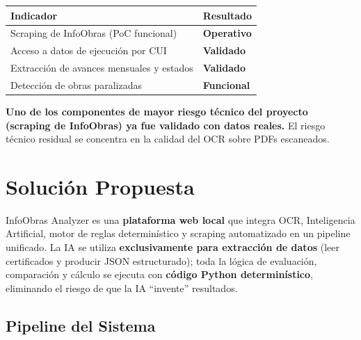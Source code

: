\documentclass[11pt,a4paper]{article}
\begin{document}
\begin{center}
\begin{tabular}{|>{\raggedright\arraybackslash}m{7cm}|>{\centering\arraybackslash}m{4cm}|}
\hline
\textbf{Indicador} & \textbf{Resultado} \\
\hline
Scraping de InfoObras (PoC funcional) & \textbf{Operativo} \\
\hline
Acceso a datos de ejecución por CUI & \textbf{Validado} \\
\hline
Extracción de avances mensuales y estados & \textbf{Validado} \\
\hline
Detección de obras paralizadas & \textbf{Funcional} \\
\hline
\end{tabular}
\end{center}

\textbf{Uno de los componentes de mayor riesgo técnico del proyecto (scraping de InfoObras) ya fue validado con datos reales.} El riesgo técnico residual se concentra en la calidad del OCR sobre PDFs escaneados.

\section{Solución Propuesta}

InfoObras Analyzer es una \textbf{plataforma web local} que integra OCR, Inteligencia Artificial, motor de reglas determinístico y scraping automatizado en un pipeline unificado. La IA se utiliza \textbf{exclusivamente para extracción de datos} (leer certificados y producir JSON estructurado); toda la lógica de evaluación, comparación y cálculo se ejecuta con \textbf{código Python determinístico}, eliminando el riesgo de que la IA ``invente'' resultados.

\subsection{Pipeline del Sistema}
\end{document}
